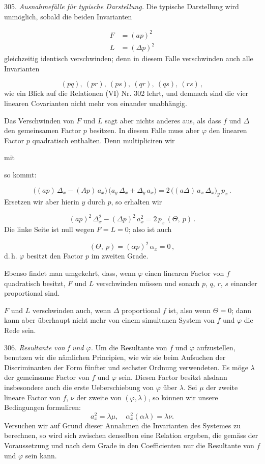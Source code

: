 305. \textit{Ausnahmefälle für typische Darstellung.} Die typische
Darstellung wird unmöglich, sobald die beiden Invarianten

\[
\begin{aligned}
F &= (ap)^2\\
L &= (\Delta p)^2
\end{aligned}
\]
gleichzeitig identisch verschwinden; denn in diesem Falle verschwinden
auch alle Invarianten

\[
(pq),\ (pr),\ (ps),\ (qr),\ (qs),\ (rs)\,,
\]
wie ein Blick auf die Relationen (VI) Nr. 302 lehrt, und demnach sind die
vier linearen Covarianten nicht mehr von einander unabhängig.

Das Verschwinden von $F$ und $L$ sagt aber nichts anderes aus, als dass
$f$ und $\Delta$ den gemeinsamen Factor $p$ besitzen. In diesem Falle muss
aber $\varphi$ den linearen Factor $p$ quadratisch enthalten. Denn
multipliciren wir

mit

so kommt:

\[
\bigl((ap)\,\Delta_x - (Ap)\,a_x\bigr)\,\bigl(a_y\,\Delta_x + \Delta_y\,a_x\bigr) = 2\,\bigl((a\Delta)\,a_x\,\Delta_x\bigr)_y\,p_x\,. %
\]
Ersetzen wir aber hierin $y$ durch $p$, so erhalten wir

\[
(ap)^2\,\Delta_x^2 - (\Delta p)^2\,a_x^2 = 2\,p_x\,(\Theta,\ p)\,.
\]
Die linke Seite ist null wegen $F = L = 0$; also ist auch

\[
(\Theta,\ p) = (\alpha p)^2\,\alpha_x = 0\,,
\]
d.\,h. $\varphi$ besitzt den Factor $p$ im zweiten Grade.

Ebenso findet man umgekehrt, dass, wenn $\varphi$ einen linearen Factor
von $f$ quadratisch besitzt, $F$ und $L$ verschwinden müssen und sonach
$p$, $q$, $r$, $s$ einander proportional sind.



$F$ und $L$ verschwinden auch, wenn $\Delta$ proportional $f$ ist, also
wenn $\Theta = 0$; dann kann aber überhaupt nicht mehr von einem simultanen
System von $f$ und $\varphi$ die Rede sein.

306. \textit{Resultante von f und $\varphi$.} Um die Resultante von $f$ und
$\varphi$ aufzustellen, benutzen wir die nämlichen Principien, wie wir sie
beim Aufsuchen der Discriminanten der Form fünfter und sechster Ordnung
verwendeten. Es möge $\lambda$ der gemeinsame Factor von $f$ und $\varphi$
sein. Diesen Factor besitzt alsdann insbesondere auch die erste
Ueberschiebung von $\varphi$ über $\lambda$. Sei $\mu$ der zweite lineare
Factor von $f$, $\nu$ der zweite von $(\varphi, \lambda)$, so können wir
unsere Bedingungen formuliren:
\[
a_x^2 = \lambda\mu, \quad \alpha_x^2(\alpha\lambda) = \lambda\nu.
\]
Versuchen wir auf Grund dieser Annahmen die Invarianten des Systemes zu
berechnen, so wird sich zwischen denselben eine Relation ergeben, die
gemäss der Voraussetzung und nach dem Grade in den Coefficienten nur die
Resultante von $f$ und $\varphi$ sein kann.

